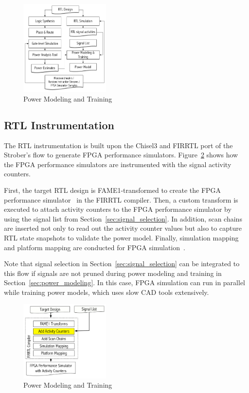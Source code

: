 \begin{figure}[!ht]
	\centering
	\includegraphics[width=0.4\textwidth,height=\textheight,keepaspectratio]{images/power_modeling.pdf}
	\caption{Power Modeling and Training}
	\label{fig:power_modeling}
\end{figure}

\subsection{RTL Instrumentation}
\label{sec:instrumentation}
The RTL instrumentation is built upon the Chisel3 and FIRRTL port of the Strober's flow
to generate FPGA performance simulators. Figure~\ref{fig:power_modeling} shows how
the FPGA performance simulators are instrumented with the signal activity counters.

First, the target RTL design is FAME1-transformed to create the FPGA performance simulator~\cite{Kim2016}
in the FIRRTL compiler. Then, a custom transform is executed to attach activity counters
to the FPGA performance simulator by using the signal list from Section~\ref{sec:signal_selection}.
In addition, scan chains are inserted not only to read out the activity counter values but also to
capture RTL state snapshots to validate the power model. Finally, simulation mapping and platform mapping
are conducted for FPGA simulation~\cite{Kim2016}.

Note that signal selection in Section~\ref{sec:signal_selection} can be integrated to
this flow if signals are not pruned during power modeling and training in
Section~\ref{sec:power_modeling}. In this case, FPGA simulation can run in parallel while
training power models, which uses slow CAD tools extensively.

\begin{figure}[!ht]
	\centering
	\includegraphics[width=0.4\textwidth,height=\textheight,keepaspectratio]{images/instrumentation.pdf}
	\caption{Power Modeling and Training}
	\label{fig:power_modeling}
\end{figure}

